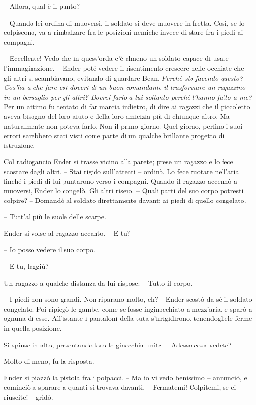 {-- Allora, qual è il punto?}

{-- Quando lei ordina di muoversi, il soldato si deve muovere in fretta.
	Così, se lo colpiscono, va a rimbalzare fra le posizioni nemiche invece
	di stare fra i piedi ai compagni.}

{-- Eccellente! Vedo che in quest'orda c'è almeno un soldato capace di
	usare l'immaginazione. -- Ender poté vedere il risentimento crescere
	nelle occhiate che gli altri si scambiavano, evitando di guardare Bean.
	\emph{Perché sto facendo questo? Cos'ha a che fare coi doveri di un buon
		comandante il trasformare un ragazzino in un bersaglio per gli altri?
		Dovrei farlo a lui soltanto perché l'hanno fatto a me?} Per un attimo fu
	tentato di far marcia indietro, di dire ai ragazzi che il piccoletto
	aveva bisogno del loro aiuto e della loro amicizia più di chiunque
	altro. Ma naturalmente non poteva farlo. Non il primo giorno. Quel
	giorno, perfino i suoi errori sarebbero stati visti come parte di un
	qualche brillante progetto di istruzione.}

{Col radiogancio Ender si trasse vicino alla parete; prese un ragazzo e
	lo fece scostare dagli altri. -- Stai rigido sull'attenti -- ordinò. Lo
	fece ruotare nell'aria finché i piedi di lui puntarono verso i compagni.
	Quando il ragazzo accennò a muoversi, Ender lo congelò. Gli altri
	risero. -- Quali parti del suo corpo potresti colpire? -- Domandò al
	soldato direttamente davanti ai piedi di quello congelato.}

{-- Tutt'al più le suole delle scarpe.}

{Ender si volse al ragazzo accanto. -- E tu?}

{-- Io posso vedere il suo corpo.}

{-- E tu, laggiù?}

{Un ragazzo a qualche distanza da lui rispose: -- Tutto il corpo.}

{-- I piedi non sono grandi. Non riparano molto, eh? -- Ender scostò da
	sé il soldato congelato. Poi ripiegò le gambe, come se fosse
	inginocchiato a mezz'aria, e sparò a ognuna di esse. All'istante i
	pantaloni della tuta s'irrigidirono, tenendogliele ferme in quella
	posizione.}

{Si spinse in alto, presentando loro le ginocchia unite. -- Adesso cosa
	vedete?}

{Molto di meno, fu la risposta.}

{Ender si piazzò la pistola fra i polpacci. -- Ma io vi vedo benissimo
	-- annunciò, e cominciò a sparare a quanti si trovava davanti. --
	Fermatemi! Colpitemi, se ci riuscite! -- gridò.}

